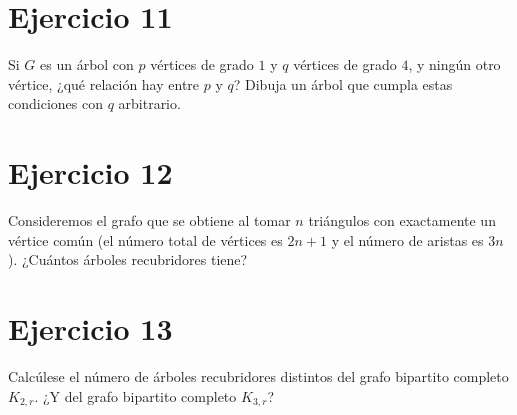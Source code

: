 \documentclass[12pt]{article}
\begin{document}
\section*{Ejercicio 11}
Si $G$ es un árbol con $p$ vértices de grado $1$ y $q$ vértices de grado $4$, y ningún otro vértice, ¿qué relación hay entre $p$ y $q$? Dibuja un árbol que cumpla estas condiciones con $q$ arbitrario.

\section*{Ejercicio 12}
Consideremos el grafo que se obtiene al tomar $n$ triángulos con exactamente un vértice común (el número total de vértices es $2n+1$ y el número de aristas es $3n$). ¿Cuántos árboles recubridores tiene?

\section*{Ejercicio 13}
Calcúlese el número de árboles recubridores distintos del grafo bipartito completo $K_{2,r}$. ¿Y del grafo bipartito completo $K_{3,r}$?
\end{document}
